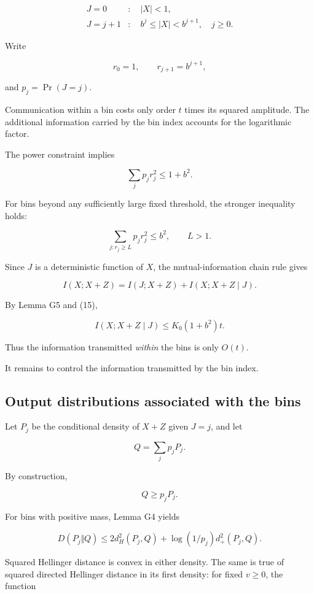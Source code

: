 \documentclass[11pt]{article}
\begin{document}
\[
\begin{aligned}
J=0 &: \quad |X|<1,\\
J=j+1 &: \quad b^j\leq |X|<b^{j+1},
\quad j\geq0.
\end{aligned}
\]

Write

\[
r_0=1,\qquad r_{j+1}=b^{j+1},
\]

and \(p_j=\Pr(J=j)\).

Communication within a bin costs only order \(t\) times its squared amplitude. The additional information carried by the bin index accounts for the logarithmic factor.

The power constraint implies

\[
\sum_jp_jr_j^2\leq1+b^2.
\tag{15}
\]

For bins beyond any sufficiently large fixed threshold, the stronger inequality holds:

\[
\sum_{j:r_j\geq L}p_jr_j^2
\leq b^2,\qquad L>1.
\tag{16}
\]

Since \(J\) is a deterministic function of \(X\), the mutual-information chain rule gives

\[
I(X;X+Z)
=
I(J;X+Z)+I(X;X+Z\mid J).
\tag{17}
\]

By Lemma G5 and (15),

\[
I(X;X+Z\mid J)
\leq K_0(1+b^2)t.
\tag{18}
\]

Thus the information transmitted \emph{within} the bins is only \(O(t)\).

It remains to control the information transmitted by the bin index.

\subsection{Output distributions associated with the bins}

Let \(P_j\) be the conditional density of \(X+Z\) given \(J=j\), and let

\[
Q=\sum_jp_jP_j.
\]

By construction,

\[
Q\geq p_jP_j.
\]

For bins with positive mass, Lemma G4 yields

\[
D(P_j\Vert Q)
\leq
2d_H^2(P_j,Q)
+\log(1/p_j)d_+^2(P_j,Q).
\tag{19}
\]

Squared Hellinger distance is convex in either density. The same is true of squared directed Hellinger distance in its first density: for fixed \(v\geq0\), the function
\end{document}
